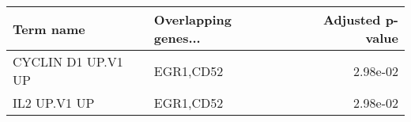 \begin{tabular}{llr}
\toprule
         Term name & Overlapping genes... &  Adjusted p-value \\
\midrule
CYCLIN D1 UP.V1 UP &            EGR1,CD52 &          2.98e-02 \\
      IL2 UP.V1 UP &            EGR1,CD52 &          2.98e-02 \\
\bottomrule
\end{tabular}
